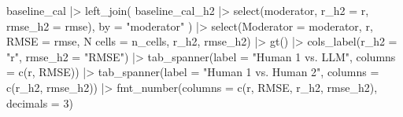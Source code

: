 \documentclass[
  letterpaper,
  DIV=11,
  numbers=noendperiod]{scrartcl}
\newenvironment{Shaded}{\begin{snugshade}}{\end{snugshade}}
\newcommand{\AttributeTok}[1]{\textcolor[rgb]{0.40,0.45,0.13}{#1}}
\newcommand{\DecValTok}[1]{\textcolor[rgb]{0.68,0.00,0.00}{#1}}
\newcommand{\FunctionTok}[1]{\textcolor[rgb]{0.28,0.35,0.67}{#1}}
\newcommand{\NormalTok}[1]{\textcolor[rgb]{0.00,0.23,0.31}{#1}}
\newcommand{\OtherTok}[1]{\textcolor[rgb]{0.00,0.23,0.31}{#1}}
\newcommand{\SpecialCharTok}[1]{\textcolor[rgb]{0.37,0.37,0.37}{#1}}
\newcommand{\StringTok}[1]{\textcolor[rgb]{0.13,0.47,0.30}{#1}}
\begin{document}
\begin{Shaded}
\begin{Highlighting}[]
\NormalTok{baseline\_cal }\SpecialCharTok{|\textgreater{}}
  \FunctionTok{left\_join}\NormalTok{(}
\NormalTok{    baseline\_cal\_h2 }\SpecialCharTok{|\textgreater{}} \FunctionTok{select}\NormalTok{(moderator, }\AttributeTok{r\_h2 =}\NormalTok{ r, }\AttributeTok{rmse\_h2 =}\NormalTok{ rmse),}
    \AttributeTok{by =} \StringTok{"moderator"}
\NormalTok{  ) }\SpecialCharTok{|\textgreater{}}
  \FunctionTok{select}\NormalTok{(}\AttributeTok{Moderator =}\NormalTok{ moderator, r, }\AttributeTok{RMSE =}\NormalTok{ rmse, }\StringTok{\textasciigrave{}}\AttributeTok{N cells}\StringTok{\textasciigrave{}} \OtherTok{=}\NormalTok{ n\_cells, r\_h2, rmse\_h2) }\SpecialCharTok{|\textgreater{}}
  \FunctionTok{gt}\NormalTok{() }\SpecialCharTok{|\textgreater{}}
  \FunctionTok{cols\_label}\NormalTok{(}\AttributeTok{r\_h2 =} \StringTok{"r"}\NormalTok{, }\AttributeTok{rmse\_h2 =} \StringTok{"RMSE"}\NormalTok{) }\SpecialCharTok{|\textgreater{}}
  \FunctionTok{tab\_spanner}\NormalTok{(}\AttributeTok{label =} \StringTok{"Human 1 vs. LLM"}\NormalTok{,     }\AttributeTok{columns =} \FunctionTok{c}\NormalTok{(r, RMSE)) }\SpecialCharTok{|\textgreater{}}
  \FunctionTok{tab\_spanner}\NormalTok{(}\AttributeTok{label =} \StringTok{"Human 1 vs. Human 2"}\NormalTok{, }\AttributeTok{columns =} \FunctionTok{c}\NormalTok{(r\_h2, rmse\_h2)) }\SpecialCharTok{|\textgreater{}}
  \FunctionTok{fmt\_number}\NormalTok{(}\AttributeTok{columns =} \FunctionTok{c}\NormalTok{(r, RMSE, r\_h2, rmse\_h2), }\AttributeTok{decimals =} \DecValTok{3}\NormalTok{)}
\end{Highlighting}
\end{Shaded}
\end{document}
